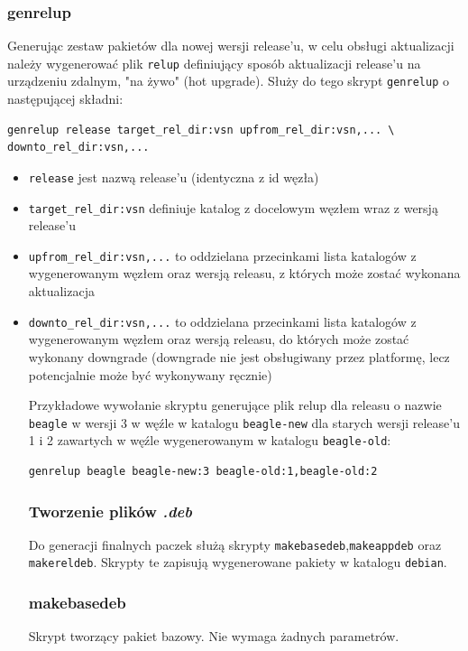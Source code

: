 \documentclass[polish,12pt]{aghthesis}
\begin{document}
\subsubsection{genrelup}

Generując zestaw pakietów dla nowej wersji release'u, w celu obsługi aktualizacji należy wygenerować plik \texttt{relup} definiujący sposób aktualizacji release'u na urządzeniu zdalnym, "na żywo" (hot upgrade). Służy do tego skrypt \texttt{genrelup} o następującej składni:
\begin{lstlisting}
genrelup release target_rel_dir:vsn upfrom_rel_dir:vsn,... \
downto_rel_dir:vsn,...
\end{lstlisting}

\begin{itemize}
\item \texttt{release} jest nazwą release'u (identyczna z id węzła)
\item \texttt{target\_rel\_dir:vsn} definiuje katalog z docelowym węzłem wraz z wersją release'u
\item \texttt{upfrom\_rel\_dir:vsn,...} to oddzielana przecinkami lista katalogów z wygenerowanym węzłem oraz wersją releasu, z których może zostać wykonana aktualizacja
\item \texttt{downto\_rel\_dir:vsn,...} to oddzielana przecinkami lista katalogów z wygenerowanym węzłem oraz wersją releasu, do których może zostać wykonany downgrade (downgrade nie jest obsługiwany przez platformę, lecz potencjalnie może być wykonywany ręcznie)

Przykładowe wywołanie skryptu generujące plik relup dla releasu o nazwie \texttt{beagle} w wersji 3 w węźle w katalogu \texttt{beagle-new} dla starych wersji release'u 1 i 2 zawartych w węźle wygenerowanym w katalogu \texttt{beagle-old}:
\begin{lstlisting}
genrelup beagle beagle-new:3 beagle-old:1,beagle-old:2
\end{lstlisting}
\subsubsection{Tworzenie plików \emph{.deb}}
Do generacji finalnych paczek służą skrypty \texttt{makebasedeb},\texttt{makeappdeb} oraz \texttt{makereldeb}. Skrypty te zapisują wygenerowane pakiety w katalogu \texttt{debian}.
\subsubsection{makebasedeb}
Skrypt tworzący pakiet bazowy. Nie wymaga żadnych parametrów.

\end{itemize}
\end{document}
